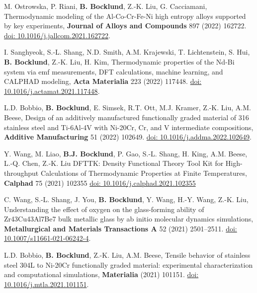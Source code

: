 \item M. Ostrowska, P. Riani, \textbf{B. Bocklund}, Z.-K. Liu, G. Cacciamani,
Thermodynamic modeling of the Al-Co-Cr-Fe-Ni high entropy alloys supported by key experiments,
  \textbf{Journal of Alloys and Compounds} 897 (2022) 162722.
  \href{https://doi.org/10.1016/j.jallcom.2021.162722}{doi: 10.1016/j.jallcom.2021.162722}.

\item I. Sanghyeok, S.-L. Shang, N.D. Smith, A.M. Krajewski, T. Lichtenstein, S. Hui, \textbf{B. Bocklund}, Z.-K. Liu, H. Kim,
Thermodynamic properties of the Nd-Bi system via emf measurements, DFT calculations, machine learning, and CALPHAD modeling,
  \textbf{Acta Materialia} 223 (2022) 117448.
  \href{https://doi.org/10.1016/j.actamat.2021.117448}{doi: 10.1016/j.actamat.2021.117448}.

\item L.D. Bobbio, \textbf{B. Bocklund}, E. Simsek, R.T. Ott, M.J. Kramer, Z.-K. Liu, A.M. Beese,
Design of an additively manufactured functionally graded material of 316 stainless steel and Ti-6Al-4V with Ni-20Cr, Cr, and V intermediate compositions,
  \textbf{Additive Manufacturing} 51 (2022) 102649.
  \href{https://doi.org/10.1016/j.addma.2022.102649}{doi: 10.1016/j.addma.2022.102649}.


\item Y. Wang, M. Liao, \textbf{B.J. Bocklund}, P. Gao, S.-L. Shang, H. King, A.M. Beese, L.-Q. Chen, Z.-K. Liu
    DFTTK: Density Functional Theory Tool Kit for High-throughput Calculations of Thermodynamic Properties at Finite Temperatures,
    \textbf{Calphad} 75 (2021) 102355
    \href{https://doi.org/10.1016/j.calphad.2021.102355}{doi: 10.1016/j.calphad.2021.102355}

\item C. Wang, S.-L. Shang, J. You, \textbf{B. Bocklund}, Y. Wang, H.-Y. Wang, Z.-K. Liu,
Understanding the effect of oxygen on the glass-forming ability of Zr43Cu43Al7Be7 bulk metallic glass by ab initio molecular dynamics simulations,
  \textbf{Metallurgical and Materials Transactions A} 52 (2021) 2501–2511.
  \href{https://doi.org/10.1007/s11661-021-06242-4}{doi: 10.1007/s11661-021-06242-4}.

\item L.D. Bobbio, \textbf{B. Bocklund}, Z.-K. Liu, A.M. Beese,
Tensile behavior of stainless steel 304L to Ni-20Cr functionally graded material: experimental characterization and computational simulations,
  \textbf{Materialia} (2021) 101151.
  \href{https://doi.org/10.1016/j.mtla.2021.101151}{doi: 10.1016/j.mtla.2021.101151}.

